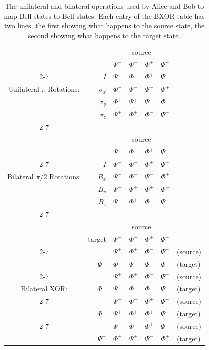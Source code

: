 \begin{enumerate}
 
\begin{table}[htbp]
\begin{tabular}{cr|llll|l}
 & &\multicolumn{4}{|c|}{source}& \\
 & &$\Psi^-$&$\Phi^-$&$\Phi^+$&$\Psi^+$&\\
\cline{2-7}
 &$I$&$\Psi^-$&$\Phi^-$&$\Phi^+$&$\Psi^+$\\
Unilateral $\pi$ Rotations:&$\sigma_x$&$\Phi^-$&$\Psi^-$&$\Psi^+$&$\Phi^+$&\\
 &$\sigma_y$&$\Phi^+$&$\Psi^+$&$\Psi^-$&$\Phi^-$&\\
 &$\sigma_z$&$\Psi^+$&$\Phi^+$&$\Phi^-$&$\Psi^-$&\\
\cline{2-7}
\vspace{.4 in}\\
 & &\multicolumn{4}{|c|}{source}&\\
 & &$\Psi^-$&$\Phi^-$&$\Phi^+$&$\Psi^+$&\\
\cline{2-7}
 &$I$&$\Psi^-$&$\Phi^-$&$\Phi^+$&$\Psi^+$&\\
Bilateral $\pi/2$ Rotations:&$B_x$&$\Psi^-$&$\Phi^-$&$\Psi^+$&$\Phi^+$&\\
 &$B_y$&$\Psi^-$&$\Psi^+$&$\Phi^+$&$\Phi^-$&\\
 &$B_z$&$\Psi^-$&$\Phi^+$&$\Phi^-$&$\Psi^+$&\\
\cline{2-7}
\vspace{.4 in}\\
 & &\multicolumn{4}{|c|}{source}& \\
 &target&$\Psi^-$&$\Phi^-$&$\Phi^+$&$\Psi^+$\\
\cline{2-7}
 & &$\Psi^+$&$\Phi^+$&$\Phi^-$&$\Psi^-$&(source)\\
 &$\Psi^-$&$\Phi^-$&$\Psi^-$&$\Psi^-$&$\Phi^-$&(target)\\
 \cline{2-7}
 & &$\Psi^+$&$\Phi^+$&$\Phi^-$&$\Psi^-$&(source)\\
Bilateral XOR:&$\Phi^-$&$\Psi^-$&$\Phi^-$&$\Phi^-$&$\Psi^-$&(target)\\
 \cline{2-7}
 & &$\Psi^-$&$\Phi^-$&$\Phi^+$&$\Psi^+$&(source)\\
 &$\Phi^+$&$\Psi^+$&$\Phi^+$&$\Phi^+$&$\Psi^+$&(target)\\
 \cline{2-7}
 & &$\Psi^-$&$\Phi^-$&$\Phi^+$&$\Psi^+$&(source)\\
 &$\Psi^+$&$\Phi^+$&$\Psi^+$&$\Psi^+$&$\Phi^+$&(target)\\
 
\end{tabular}
 
\caption{The unilateral and bilateral operations used by Alice
and Bob to map Bell states to Bell states.  Each entry of the BXOR
table has two lines, the first showing what happens to the source
state, the second showing what happens to the target state.
\label{bell_table}}
\end{table}
 

\end{enumerate}
